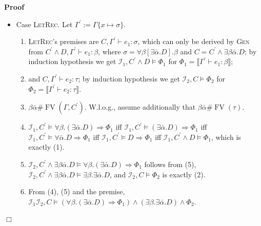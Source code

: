 \documentclass{article}
\newcommand{\assign}{:=}
\newcommand{\tmname}[1]{\textsc{#1}}
\newcommand{\tmop}[1]{\ensuremath{\operatorname{#1}}}
\newenvironment{proof}{\noindent\textbf{Proof\ }}{\hspace*{\fill}$\Box$\medskip}
\begin{document}
\begin{proof}
\begin{itemize}
\begin{enumerate}
      \item By (4) and (5), we have the goal $\mathcal{I}, C \vDash \llbracket
      \Gamma \vdash e_1 e_2 : \tau \rrbracket$ with $\mathcal{I}=\mathcal{I}_1
      \mathcal{I}_2$.
    \end{enumerate}
    \item Case {\tmname{LetRec}}. Let $\Gamma^{\prime} \assign \Gamma \{x
    \mapsto \sigma\}$.
    \begin{enumerate}
      \item {\tmname{LetRec}}'s premises are $C, \Gamma^{\prime} \vdash e_1 :
      \sigma$, which can only be derived by {\tmname{Gen}} from $C^{\prime}
      \wedge D, \Gamma^{\prime} \vdash e_1 : \beta$, where $\sigma = \forall
      \beta [\exists \bar{\alpha} .D] . \beta$ and $C = C^{\prime} \wedge
      \exists \beta \bar{\alpha} .D$; by induction hypothesis we get
      $\mathcal{I}_1, C^{\prime} \wedge D \vDash \Phi_1$ for $\Phi_1 =
      \llbracket \Gamma^{\prime} \vdash e_1 : \beta \rrbracket$;
      
      \item and $C, \Gamma^{\prime} \vdash e_2 : \tau$; by induction
      hypothesis we get $\mathcal{I}_2, C \vDash \Phi_2$ for $\Phi_2 =
      \llbracket \Gamma^{\prime} \vdash e_2 : \tau \rrbracket$.
      
      \item $\beta \bar{\alpha} \# \tmop{FV} (\Gamma, C^{\prime})$. W.l.o.g.,
      assume additionally that $\beta \bar{\alpha} \# \tmop{FV} (\tau)$.
      
      \item $\mathcal{I}_1, C^{\prime} \vDash \forall \beta . (\exists
      \bar{\alpha} .D) \Rightarrow \Phi_1$ iff $\mathcal{I}_1, C^{\prime}
      \vDash (\exists \bar{\alpha} .D) \Rightarrow \Phi_1$ iff $\mathcal{I}_1,
      C^{\prime} \vDash \forall \bar{\alpha} .D \Rightarrow \Phi_1$ iff
      $\mathcal{I}_1, C^{\prime} \vDash D \Rightarrow \Phi_1$ iff
      $\mathcal{I}_1, C^{\prime} \wedge D \vDash \Phi_1$, which is exactly
      (1).
      
      \item $\mathcal{I}_2, C^{\prime} \wedge \exists \beta \bar{\alpha} .D
      \vDash \forall \beta . (\exists \bar{\alpha} .D) \Rightarrow \Phi_1$
      follows from (5), $\mathcal{I}_2, C^{\prime} \wedge \exists \beta
      \bar{\alpha} .D \vDash \exists \beta . \exists \bar{\alpha} .D$, and
      $\mathcal{I}_2, C \vDash \Phi_2$ is exactly (2).
      
      \item From (4), (5) and the premise, $\mathcal{I}_1 \mathcal{I}_2, C
      \vDash (\forall \beta . (\exists \bar{\alpha} .D) \Rightarrow \Phi_1)
      \wedge (\exists \beta . \exists \bar{\alpha} .D) \wedge \Phi_2$.
      

\end{enumerate}
\end{itemize}
\end{proof}
\end{document}
